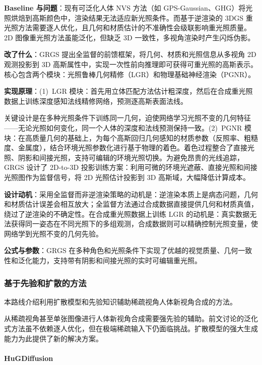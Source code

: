 \textbf{Baseline 与问题}：现有可泛化人体 NVS 方法（如 GPS-Gaussian、GHG）将光照烘焙到高斯颜色中，渲染结果无法适应新光照条件。而基于逆渲染的 3DGS 重光照方法需要逐人优化，且几何和材质估计的不准确性会级联影响重光照质量。2D 图像重光照方法虽能泛化，但缺乏 3D 一致性，多视角渲染时产生闪烁伪影。

\textbf{改了什么}：GRGS 提出全监督的前馈框架，将几何、材质和光照信息从多视角 2D 观测投影到 3D 高斯属性中，实现一次性前向推理即可获得可重光照的高斯表示。核心包含两个模块：光照鲁棒几何精修（LGR）和物理基础神经渲染（PGNR）。

\textbf{实现原理}：(1)~LGR 模块：首先用立体匹配方法估计粗深度，然后在合成重光照数据上训练深度感知法线精修网络，预测逐高斯表面法线。

关键设计是在多种光照条件下训练同一几何，迫使网络学习光照不变的几何特征——无论光照如何变化，同一个人体的深度和法线预测保持一致。(2)~PGNR 模块：在高质量几何的基础上，为每个高斯回归几何感知的材质参数（反照率、粗糙度、金属度），结合环境光照参数化进行基于物理的着色。着色过程整合了直接光照、阴影和间接光照，支持可编辑的环境光照切换。为避免昂贵的光线追踪，GRGS 设计了 2D-to-3D 投影训练方案：利用可微的环境光遮蔽、直接光照和间接光照图作为监督信号，将 2D 光照估计投影到 3D 高斯域，大幅降低计算成本。

\textbf{设计动机}：采用全监督而非逆渲染策略的动机是：逆渲染本质上是病态问题，几何和材质估计误差会相互放大；全监督方法通过合成数据直接提供几何和材质真值，绕过了逆渲染的不确定性。在合成重光照数据上训练 LGR 的动机是：真实数据无法获得同一姿态在不同光照下的多组观测，合成数据则可以精确控制光照变量，使网络学到光照不变的几何先验。

\textbf{公式与参数}：GRGS 在多种角色和光照条件下实现了优越的视觉质量、几何一致性和泛化能力，支持带有阴影和间接光照的实时可编辑重光照。

\subsubsection{基于先验和扩散的方法}

本路线介绍利用扩散模型和先验知识辅助稀疏视角人体新视角合成的方法。

从稀疏视角甚至单张图像进行人体新视角合成需要强先验的辅助。前文讨论的泛化式方法虽不依赖逐人优化，但在极端稀疏输入下仍面临挑战。扩散模型的强大生成能力为此提供了新的解决方案。

\paragraph{HuGDiffusion}

